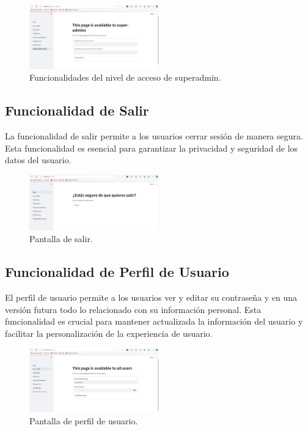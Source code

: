 \documentclass{article}
\begin{document}
\begin{figure}[h!] \centering \includegraphics[width=0.5\textwidth]{nivel_superadmin.png} \caption{Funcionalidades del nivel de acceso de superadmin.} \end{figure}
\subsection{Funcionalidad de Salir}

La funcionalidad de salir permite a los usuarios cerrar sesión de manera segura. Esta funcionalidad es esencial para garantizar la privacidad y seguridad de los datos del usuario.

\begin{figure}[h!] \centering \includegraphics[width=0.5\textwidth]{salir.png} \caption{Pantalla de salir.} \end{figure}

\subsection{Funcionalidad de Perfil de Usuario}

El perfil de usuario permite a los usuarios ver y editar su contraseña y en una versión futura todo lo relacionado con su  información personal. Esta funcionalidad es crucial para mantener actualizada la información del usuario y facilitar la personalización de la experiencia de usuario.

\begin{figure}[h!] \centering \includegraphics[width=0.5\textwidth]{perfil_usuario.png} \caption{Pantalla de perfil de usuario.} \end{figure}
\end{document}
